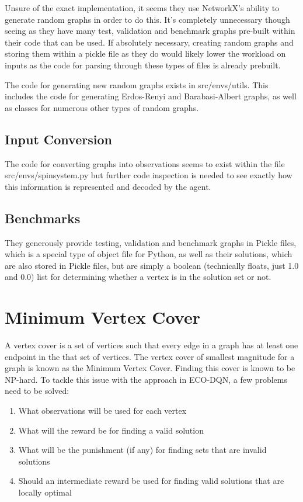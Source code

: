 \documentclass{article}
\begin{document}
Unsure of the exact implementation, it seems they use NetworkX's ability to generate random graphs in order to do this. It's completely unnecessary though seeing as they have many test, validation and benchmark graphs pre-built within their code that can be used. If absolutely necessary, creating random graphs and storing them within a pickle file as they do would likely lower the workload on inputs as the code for parsing through these types of files is already prebuilt.

The code for generating new random graphs exists in src/envs/utils. This includes the code for generating Erdos-Renyi and Barabasi-Albert graphs, as well as classes for numerous other types of random graphs.

\subsection{Input Conversion}

The code for converting graphs into observations seems to exist within the file src/envs/spinsystem.py but further code inspection is needed to see exactly how this information is represented and decoded by the agent.

\subsection{Benchmarks}

They generously provide testing, validation and benchmark graphs in Pickle files, which is a special type of object file for Python, as well as their solutions, which are also stored in Pickle files, but are simply a boolean (technically floats, just 1.0 and 0.0) list for determining whether a vertex is in the solution set or not.

\section{Minimum Vertex Cover}

A vertex cover is a set of vertices such that every edge in a graph has at least one endpoint in the that set of vertices. The vertex cover of smallest magnitude for a graph is known as the Minimum Vertex Cover. Finding this cover is known to be NP-hard. To tackle this issue with the approach in ECO-DQN, a few problems need to be solved:

\begin{enumerate}
    \item What observations will be used for each vertex 
    \item What will the reward be for finding a valid solution 
    \item What will be the punishment (if any) for finding sets that are invalid solutions 
    \item Should an intermediate reward be used for finding valid solutions that are locally optimal
\end{enumerate}
\end{document}
